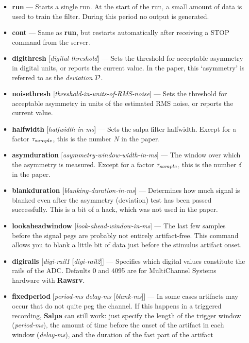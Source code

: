 \documentclass[12pt,oneside]{book}
\def\prog#1{{\bf #1}}
\def\cmd#1{{\bf #1}}
\def\arg#1{{\it #1}}
\begin{document}
\begin{itemize}
\item \cmd{run} --- Starts a single run. At the start of the run, a
small amount of data is used to train the filter. During this period
no output is generated.
\item \cmd{cont} --- Same as \cmd{run}, but restarts automatically after
receiving a STOP command from the server.
\item \cmd{digithresh} [\arg{digital-threshold}] --- Sets the threshold for acceptable
asymmetry in digital units, or reports the current value. In the
paper, this `asymmetry' is referred to as the {\it deviation} 
$\cal{D}$.
\item \cmd{noisethresh} [\arg{threshold-in-units-of-RMS-noise}] ---  Sets the threshold for acceptable
asymmetry in units of the estimated RMS noise, or reports the current
value.
\item \cmd{halfwidth} [\arg{halfwidth-in-ms}] --- Sets the {\sc salpa}
filter halfwidth. Except for a factor $\tau_{\textrm\scriptsize
sample}$, this is the number $N$ in the paper.
\item \cmd{asymduration} [\arg{asymmetry-window-width-in-ms}] --- The window
over which the asymmetry is measured.  Except for a factor $\tau_{\textrm\scriptsize
sample}$, this is the number $\delta$ in the paper.
\item \cmd{blankduration} [\arg{blanking-duration-in-ms}] --- Determines how
much signal is blanked even after the asymmetry (deviation) test has
been passed successfully. This is a bit of a hack, which was not used
in the paper.
\item \cmd{lookaheadwindow} [\arg{look-ahead-window-in-ms}] --- The last few
samples before the signal pegs are probably not entirely
artifact-free. This command allows you to blank a little bit of data
just before the stimulus artifact onset.
\item \cmd{digirails} [\arg{digi-rail1} [\arg{digi-rail2}]] --- Specifies which
digital values constitute the rails of the ADC. Defaults 0 and 4095
are for MultiChannel Systems hardware with \prog{Rawsrv}.
\item \cmd{fixedperiod} [\arg{period-ms} \arg{delay-ms} [\arg{blank-ms}]] --- In some
cases artifacts may occur that do not quite peg the channel. If this
happens in a triggered recording, \prog{Salpa} can still work: just
specify the length of the trigger window (\emph{period-ms}), the
amount of time before the onset of the artifact in each window
(\emph{delay-ms}), and the duration of the fast part of the artifact

\end{itemize}
\end{document}
